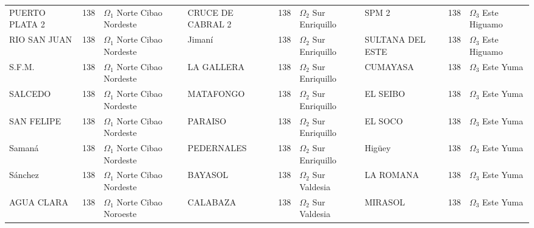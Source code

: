 \begin{table}[!p]
{{\begin{tabular}{@{}lrl@{\hspace{3.5pt}}|@{\hspace{3.5pt}}lrl@{\hspace{3.5pt}}|@{\hspace{3.5pt}}lrl@{}}
PUERTO PLATA 2 & 138 & \makecell[l]{$\Omega_1$ Norte\\Cibao Nordeste} & CRUCE DE CABRAL 2 & 138 & \makecell[l]{$\Omega_2$ Sur\\Enriquillo} & SPM 2 & 138 & \makecell[l]{$\Omega_3$ Este\\Higuamo} \\
RIO SAN JUAN & 138 & \makecell[l]{$\Omega_1$ Norte\\Cibao Nordeste} & Jimaní & 138 & \makecell[l]{$\Omega_2$ Sur\\Enriquillo} & SULTANA DEL ESTE & 138 & \makecell[l]{$\Omega_3$ Este\\Higuamo} \\
S.F.M. & 138 & \makecell[l]{$\Omega_1$ Norte\\Cibao Nordeste} & LA GALLERA & 138 & \makecell[l]{$\Omega_2$ Sur\\Enriquillo} & CUMAYASA & 138 & \makecell[l]{$\Omega_3$ Este\\Yuma} \\
SALCEDO & 138 & \makecell[l]{$\Omega_1$ Norte\\Cibao Nordeste} & MATAFONGO & 138 & \makecell[l]{$\Omega_2$ Sur\\Enriquillo} & EL SEIBO & 138 & \makecell[l]{$\Omega_3$ Este\\Yuma} \\
SAN FELIPE & 138 & \makecell[l]{$\Omega_1$ Norte\\Cibao Nordeste} & PARAISO & 138 & \makecell[l]{$\Omega_2$ Sur\\Enriquillo} & EL SOCO & 138 & \makecell[l]{$\Omega_3$ Este\\Yuma} \\
Samaná & 138 & \makecell[l]{$\Omega_1$ Norte\\Cibao Nordeste} & PEDERNALES & 138 & \makecell[l]{$\Omega_2$ Sur\\Enriquillo} & Higüey & 138 & \makecell[l]{$\Omega_3$ Este\\Yuma} \\
Sánchez & 138 & \makecell[l]{$\Omega_1$ Norte\\Cibao Nordeste} & BAYASOL & 138 & \makecell[l]{$\Omega_2$ Sur\\Valdesia} & LA ROMANA & 138 & \makecell[l]{$\Omega_3$ Este\\Yuma} \\
AGUA CLARA & 138 & \makecell[l]{$\Omega_1$ Norte\\Cibao Noroeste} & CALABAZA & 138 & \makecell[l]{$\Omega_2$ Sur\\Valdesia} & MIRASOL & 138 & \makecell[l]{$\Omega_3$ Este\\Yuma} \\

\end{tabular}}}
\end{table}
